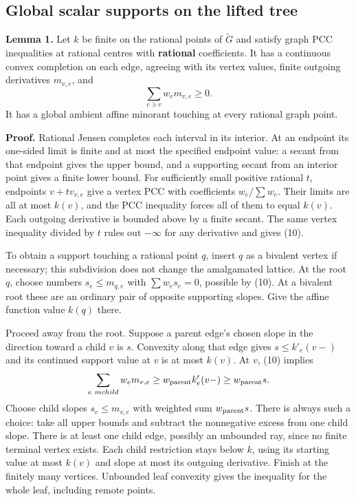 \documentclass[
  11pt,
]{article}
\begin{document}
\subsection{Global scalar supports on the lifted
tree}\label{global-scalar-supports-on-the-lifted-tree}

\textbf{Lemma 1.} Let \(k\) be finite on the rational points of
\(\widetilde G\) and satisfy graph PCC inequalities at rational centres
with \textbf{rational} coefficients. It has a continuous convex
completion on each edge, agreeing with its vertex values, finite
outgoing derivatives \(m_{v,e}\), and
\[\sum_{e\ni v}w_em_{v,e}\geq0. \tag{10}\] It has a global ambient
affine minorant touching at every rational graph point.

\textbf{Proof.} Rational Jensen completes each interval in its interior.
At an endpoint its one-sided limit is finite and at most the specified
endpoint value: a secant from that endpoint gives the upper bound, and a
supporting secant from an interior point gives a finite lower bound. For
sufficiently small positive rational \(t\), endpoints \(v+t v_{v,e}\)
give a vertex PCC with coefficients \(w_e/\sum w_e\). Their limits are
all at most \(k(v)\), and the PCC inequality forces all of them to equal
\(k(v)\). Each outgoing derivative is bounded above by a finite secant.
The same vertex inequality divided by \(t\) rules out \(-\infty\) for
any derivative and gives (10).

To obtain a support touching a rational point \(q\), insert \(q\) as a
bivalent vertex if necessary; this subdivision does not change the
amalgamated lattice. At the root \(q\), choose numbers
\(s_e\leq m_{q,e}\) with \(\sum w_es_e=0\), possible by (10). At a
bivalent root these are an ordinary pair of opposite supporting slopes.
Give the affine function value \(k(q)\) there.

Proceed away from the root. Suppose a parent edge's chosen slope in the
direction toward a child \(v\) is \(s\). Convexity along that edge gives
\(s\leq k'_e(v-)\) and its continued support value at \(v\) is at most
\(k(v)\). At \(v\), (10) implies
\[\sum_{e\ {m child}}w_em_{v,e}\geq w_{\rm parent}k'_e(v-)\geq w_{\rm parent}s.\]
Choose child slopes \(s_e\leq m_{v,e}\) with weighted sum
\(w_{\rm parent}s\). There is always such a choice: take all upper
bounds and subtract the nonnegative excess from one child slope. There
is at least one child edge, possibly an unbounded ray, since no finite
terminal vertex exists. Each child restriction stays below \(k\), using
its starting value at most \(k(v)\) and slope at most its outgoing
derivative. Finish at the finitely many vertices. Unbounded leaf
convexity gives the inequality for the whole leaf, including remote
points.
\end{document}
